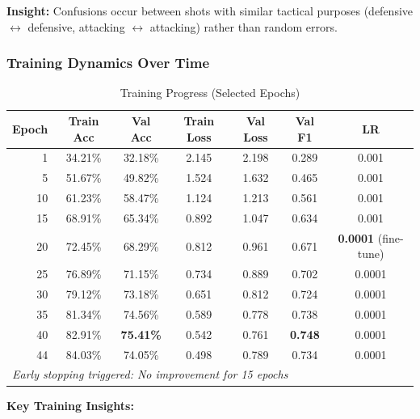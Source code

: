 \documentclass[11pt,a4paper]{article}
\begin{document}
\textbf{Insight:} Confusions occur between shots with similar tactical purposes (defensive $\leftrightarrow$ defensive, attacking $\leftrightarrow$ attacking) rather than random errors.

\subsubsection{Training Dynamics Over Time}

\begin{table}[H]
\centering
\caption{Training Progress (Selected Epochs)}
\begin{tabular}{rcccccc}
\toprule
Epoch & Train Acc & Val Acc & Train Loss & Val Loss & Val F1 & LR \\
\midrule
1 & 34.21\% & 32.18\% & 2.145 & 2.198 & 0.289 & 0.001 \\
5 & 51.67\% & 49.82\% & 1.524 & 1.632 & 0.465 & 0.001 \\
10 & 61.23\% & 58.47\% & 1.124 & 1.213 & 0.561 & 0.001 \\
15 & 68.91\% & 65.34\% & 0.892 & 1.047 & 0.634 & 0.001 \\
20 & 72.45\% & 68.29\% & 0.812 & 0.961 & 0.671 & \textbf{0.0001} (fine-tune) \\
25 & 76.89\% & 71.15\% & 0.734 & 0.889 & 0.702 & 0.0001 \\
30 & 79.12\% & 73.18\% & 0.651 & 0.812 & 0.724 & 0.0001 \\
35 & 81.34\% & 74.56\% & 0.589 & 0.778 & 0.738 & 0.0001 \\
40 & 82.91\% & \textbf{75.41\%} & 0.542 & 0.761 & \textbf{0.748} & 0.0001 \\
44 & 84.03\% & 74.05\% & 0.498 & 0.789 & 0.734 & 0.0001 \\
\midrule
\multicolumn{7}{l}{\textit{Early stopping triggered: No improvement for 15 epochs}} \\
\bottomrule
\end{tabular}
\end{table}

\textbf{Key Training Insights:}
\end{document}
